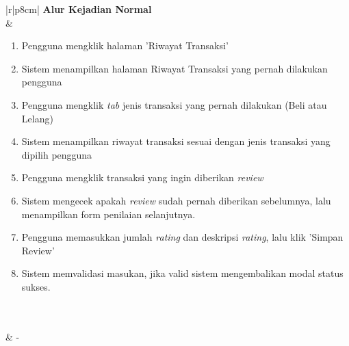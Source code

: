 \begin{table}[H]
\begin{tabular}{|r|p{8cm}|}
			{\textbf{Alur Kejadian Normal}}                                                                            
			\\ \hline
			 & 
			\begin{enumerate}
				\item Pengguna mengklik halaman 'Riwayat Transaksi'
				\item Sistem menampilkan halaman Riwayat Transaksi yang pernah dilakukan pengguna
				\item Pengguna mengklik \textit{tab} jenis transaksi yang pernah dilakukan (Beli atau Lelang)
				\item \label{uc0402-show1page}Sistem menampilkan riwayat transaksi sesuai dengan jenis transaksi yang dipilih pengguna
				\item Pengguna mengklik transaksi yang ingin diberikan \textit{review}
				\item \label{al-0402-a}Sistem mengecek apakah \textit{review} sudah pernah diberikan sebelumnya, lalu menampilkan form penilaian selanjutnya.
				\item Pengguna memasukkan jumlah \textit{rating} dan deskripsi \textit{rating}, lalu klik 'Simpan Review'
				\item \label{al-0402-b}Sistem memvalidasi masukan, jika valid sistem mengembalikan modal status sukses.				
			\end{enumerate}
			\\ \hline
			 \\ \hline
			                                   \pagebreak        
			& -
			\\ \hline
		\end{tabular}
	\end{table}